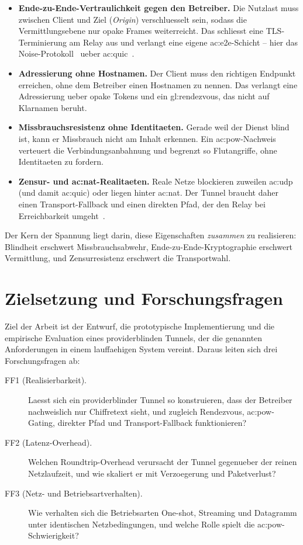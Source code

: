 \begin{itemize}
  \item \textbf{Ende-zu-Ende-Vertraulichkeit gegen den Betreiber.} Die Nutzlast
    muss zwischen Client und Ziel (\emph{Origin}) verschluesselt sein, sodass die
    Vermittlungsebene nur opake Frames weiterreicht. Das schliesst eine
    TLS-Terminierung am Relay aus und verlangt eine eigene
    \gls{ac:e2e}-Schicht -- hier das Noise-Protokoll~\cite{perrin2018noise} ueber
    \gls{ac:quic}~\cite{rfc9000,rfc9001}.
  \item \textbf{Adressierung ohne Hostnamen.} Der Client muss den richtigen
    Endpunkt erreichen, ohne dem Betreiber einen Hostnamen zu nennen. Das
    verlangt eine Adressierung ueber opake Tokens und ein \gls{gl:rendezvous},
    das nicht auf Klarnamen beruht.
  \item \textbf{Missbrauchsresistenz ohne Identitaeten.} Gerade weil der Dienst
    blind ist, kann er Missbrauch nicht am Inhalt erkennen. Ein
    \gls{ac:pow}-Nachweis~\cite{back2002hashcash} verteuert die
    Verbindungsanbahnung und begrenzt so Flutangriffe, ohne Identitaeten zu
    fordern.
  \item \textbf{Zensur- und \gls{ac:nat}-Realitaeten.} Reale Netze blockieren
    zuweilen \gls{ac:udp} (und damit \gls{ac:quic}) oder liegen hinter
    \gls{ac:nat}. Der Tunnel braucht daher einen Transport-Fallback und einen
    direkten Pfad, der den Relay bei Erreichbarkeit umgeht~\cite{ford2005peer}.
\end{itemize}

Der Kern der Spannung liegt darin, diese Eigenschaften \emph{zusammen} zu
realisieren: Blindheit erschwert Missbrauchsabwehr, Ende-zu-Ende-Kryptographie
erschwert Vermittlung, und Zensurresistenz erschwert die Transportwahl.

\section{Zielsetzung und Forschungsfragen}
\label{sec:ziele}

Ziel der Arbeit ist der Entwurf, die prototypische Implementierung und die
empirische Evaluation eines providerblinden Tunnels, der die genannten
Anforderungen in einem lauffaehigen System vereint. Daraus leiten sich drei
Forschungsfragen ab:

\begin{description}
  \item[FF1 (Realisierbarkeit).] Laesst sich ein providerblinder Tunnel so
    konstruieren, dass der Betreiber nachweislich nur Chiffretext sieht, und
    zugleich Rendezvous, \gls{ac:pow}-Gating, direkter Pfad und
    Transport-Fallback funktionieren?
  \item[FF2 (Latenz-Overhead).] Welchen Roundtrip-Overhead verursacht der Tunnel
    gegenueber der reinen Netzlaufzeit, und wie skaliert er mit Verzoegerung und
    Paketverlust?
  \item[FF3 (Netz- und Betriebsartverhalten).] Wie verhalten sich die
    Betriebsarten One-shot, Streaming und Datagramm unter identischen
    Netzbedingungen, und welche Rolle spielt die \gls{ac:pow}-Schwierigkeit?
\end{description}

